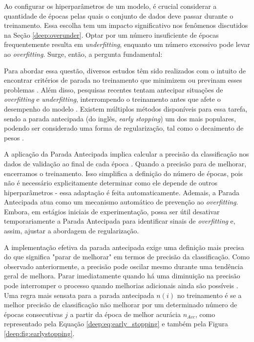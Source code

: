 Ao configurar os hiperparâmetros de um modelo, é crucial considerar a quantidade de épocas pelas quais o conjunto de dados deve passar durante o treinamento. Essa escolha tem um impacto significativo nos fenômenos discutidos na Seção \ref{deep:overunder}. Optar por um número insuficiente de épocas frequentemente resulta em \textit{underfitting}, enquanto um número excessivo pode levar ao \textit{overfitting}. Surge, então, a pergunta fundamental: 

Para abordar essa questão, diversos estudos têm sido realizados com o intuito de encontrar critérios de parada no treinamento que minimizem ou previnam esses problemas \citep{Prechelt1998AutomaticCriteria}. Além disso, pesquisas recentes tentam antecipar situações de \textit{overfitting} e \textit{underfitting}, interrompendo o treinamento antes que afete o desempenho do modelo \citep{VilaresFerro2023EarlyNetworks}. Existem múltiplos métodos disponíveis para essa tarefa, sendo a parada antecipada (do inglês, \textit{early stopping}) um dos mais populares, podendo ser considerado uma forma de regularização, tal como o decaimento de pesos \cite{VilaresFerro2023EarlyNetworks}.

A aplicação da Parada Antecipada implica calcular a precisão da classificação nos dados de validação ao final de cada época \citep{Prechelt1998AutomaticCriteria}. Quando a precisão para de melhorar, encerramos o treinamento. Isso simplifica a definição do número de épocas, pois não é necessário explicitamente determinar como ele depende de outros hiperparâmetros - essa adaptação é feita automaticamente. Ademais, a Parada Antecipada atua como um mecanismo automático de prevenção ao \textit{overfitting}. Embora, em estágios iniciais de experimentação, possa ser útil desativar temporariamente a Parada Antecipada para identificar sinais de \textit{overfitting} e, assim, ajustar a abordagem de regularização.

A implementação efetiva da parada antecipada exige uma definição mais precisa do que significa "parar de melhorar" em termos de precisão da classificação. Como observado anteriormente, a precisão pode oscilar mesmo durante uma tendência geral de melhora. Parar imediatamente quando há uma diminuição na precisão pode interromper o processo quando melhorias adicionais ainda são possíveis \citep{Prechelt1998EarlyWhen}. Uma regra mais sensata para a parada antecipada $n(i)$ no treinamento é se a melhor precisão de classificação não melhorar por um determinado número de épocas consecutivas $j$ a partir da época de melhor acurácia $n_{Acc}$, como representado pela Equação \ref{deep:eq:early_stopping} e também pela Figura \ref{deep:fig:earlystopping}.

